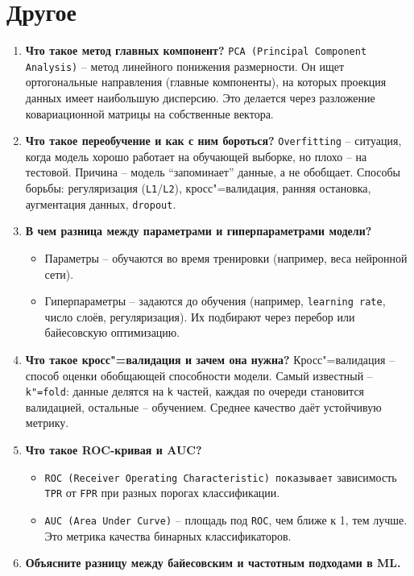 \documentclass{article}
\begin{document}
\section{Другое}
\begin{enumerate}
    \item \textbf{Что такое метод главных компонент?} \texttt{PCA (Principal Component Analysis)} -- метод линейного понижения размерности. Он ищет ортогональные направления (главные компоненты), на которых проекция данных имеет наибольшую дисперсию. Это делается через разложение ковариационной матрицы на собственные вектора.
    \item \textbf{Что такое переобучение и как с ним бороться?} \texttt{Overfitting} -- ситуация, когда модель хорошо работает на обучающей выборке, но плохо -- на тестовой. Причина -- модель ``запоминает'' данные, а не обобщает.
    Способы борьбы: регуляризация (\texttt{L1}/\texttt{L2}), кросс"=валидация, ранняя остановка, аугментация данных, \texttt{dropout}.
    \item \textbf{В чем разница между параметрами и гиперпараметрами модели?}
    \begin{itemize}
        \item Параметры -- обучаются во время тренировки (например, веса нейронной сети).
        \item Гиперпараметры -- задаются до обучения (например, \texttt{learning rate}, число слоёв, регуляризация). Их подбирают через перебор или байесовскую оптимизацию.
    \end{itemize}
    \item \textbf{Что такое кросс"=валидация и зачем она нужна?} Кросс"=валидация -- способ оценки обобщающей способности модели.
    Самый известный -- \texttt{k"=fold}: данные делятся на \texttt{k} частей, каждая по очереди становится валидацией, остальные -- обучением. Среднее качество даёт устойчивую метрику.
    \item \textbf{Что такое ROC-кривая и AUC?}
    \begin{itemize}
        \item \texttt{ROC (Receiver Operating Characteristic) показывает} зависимость \texttt{TPR} от \texttt{FPR} при разных порогах классификации.
        \item \texttt{AUC (Area Under Curve)} -- площадь под \texttt{ROC}, чем ближе к 1, тем лучше. Это метрика качества бинарных классификаторов.
    \end{itemize}
    \item \textbf{Объясните разницу между байесовским и частотным подходами в ML.}

\end{enumerate}
\end{document}
